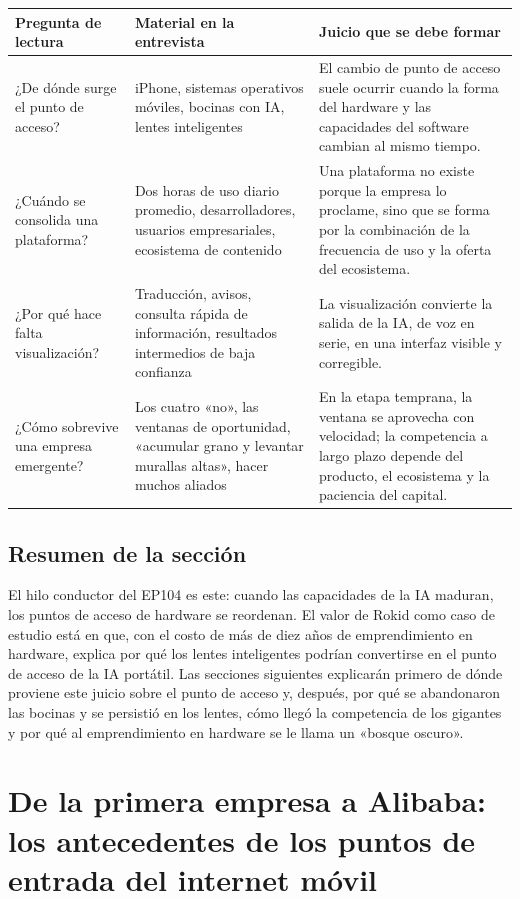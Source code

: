 \documentclass[a4paper]{article}
\begin{document}
\noindent\begin{tabularx}{\textwidth}{p{}p{}X}
\toprule
Pregunta de lectura & Material en la entrevista & Juicio que se debe formar \\
\midrule
¿De dónde surge el punto de acceso? & iPhone, sistemas operativos móviles, bocinas con IA, lentes inteligentes & El cambio de punto de acceso suele ocurrir cuando la forma del hardware y las capacidades del software cambian al mismo tiempo. \\
¿Cuándo se consolida una plataforma? & Dos horas de uso diario promedio, desarrolladores, usuarios empresariales, ecosistema de contenido & Una plataforma no existe porque la empresa lo proclame, sino que se forma por la combinación de la frecuencia de uso y la oferta del ecosistema. \\
¿Por qué hace falta visualización? & Traducción, avisos, consulta rápida de información, resultados intermedios de baja confianza & La visualización convierte la salida de la IA, de voz en serie, en una interfaz visible y corregible. \\
¿Cómo sobrevive una empresa emergente? & Los cuatro «no», las ventanas de oportunidad, «acumular grano y levantar murallas altas», hacer muchos aliados & En la etapa temprana, la ventana se aprovecha con velocidad; la competencia a largo plazo depende del producto, el ecosistema y la paciencia del capital. \\
\bottomrule
\end{tabularx}

\subsection{Resumen de la sección}

El hilo conductor del EP104 es este: cuando las capacidades de la IA maduran, los puntos de acceso de hardware se reordenan. El valor de Rokid como caso de estudio está en que, con el costo de más de diez años de emprendimiento en hardware, explica por qué los lentes inteligentes podrían convertirse en el punto de acceso de la IA portátil. Las secciones siguientes explicarán primero de dónde proviene este juicio sobre el punto de acceso y, después, por qué se abandonaron las bocinas y se persistió en los lentes, cómo llegó la competencia de los gigantes y por qué al emprendimiento en hardware se le llama un «bosque oscuro».
\section{De la primera empresa a Alibaba: los antecedentes de los puntos de entrada del internet móvil}
\end{document}
